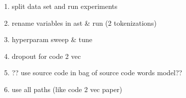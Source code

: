  \begin{enumerate}
   \item split data set and run experiments
   \item rename variables in ast \& run (2 tokenizations)
   \item hyperparam sweep \& tune
   \item dropout for code 2 vec
   \item ?? use source code in bag of source code words model??
   \item use all paths (like code 2 vec paper)
 \end{enumerate}
 






